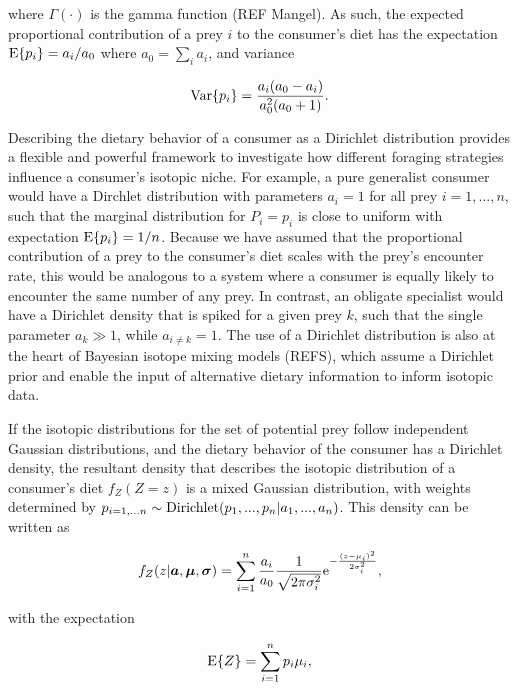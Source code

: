 \documentclass[11pt]{article}
\begin{document}
\noindent where $\Gamma(\cdot)$ is the gamma function (REF Mangel).
As such, the expected proportional contribution of a prey $i$ to the consumer's diet has the expectation ${\rm E}\{p_i\}=a_i/a_0$ where $a_0 = \sum_i a_i$, and variance

\begin{equation}
  \label{eqDirVar}
  {\rm Var}\{p_i\} = \frac{a_i(a_0 - a_i)}{a_0^2(a_0 + 1)}.
\end{equation}

Describing the dietary behavior of a consumer as a Dirichlet distribution provides a flexible and powerful framework to investigate how different foraging strategies influence a consumer's isotopic niche.
For example, a pure generalist consumer would have a Dirchlet distribution with parameters $a_i = 1$ for all prey $i=1,...,n$, such that the marginal distribution for $P_i = p_i$ is close to uniform with expectation ${\rm E}\{p_i\} = 1/n$.
Because we have assumed that the proportional contribution of a prey to the consumer's diet scales with the prey's encounter rate, this would be analogous to a system where a consumer is equally likely to encounter the same number of any prey.
In contrast, an obligate specialist would have a Dirichlet density that is spiked for a given prey $k$, such that the single parameter $a_k \gg 1$, while $a_{i \neq k} = 1$.
The use of a Dirichlet distribution is also at the heart of Bayesian isotope mixing models (REFS), which assume a Dirichlet prior and enable the input of alternative dietary information to inform isotopic data.


If the isotopic distributions for the set of potential prey follow independent Gaussian distributions, and the dietary behavior of the consumer has a Dirichlet density, the resultant density that describes the isotopic distribution of a consumer's diet $f_Z(Z=z)$ is a mixed Gaussian distribution, with weights determined by $p_{i=1,...n} \sim {\rm Dirichlet}(p_1,...,p_n|a_1,...,a_n)$.
This density can be written as

\begin{equation}
f_Z(z|{\bm a},{\bm \mu},{\bm \sigma}) = \sum_{i=1}^n \frac{a_i}{a_0}\frac{1}{\sqrt{2 \pi \sigma_i^2}}{\rm e}^{-\frac{(z-\mu_i)^2}{2\sigma_i^2}},
\end{equation}

\noindent with the expectation

\begin{equation}
\label{eqEZ}
  {\rm E}\{Z\} = \sum_{i=1}^n p_i \mu_i,
\end{equation}
\end{document}
